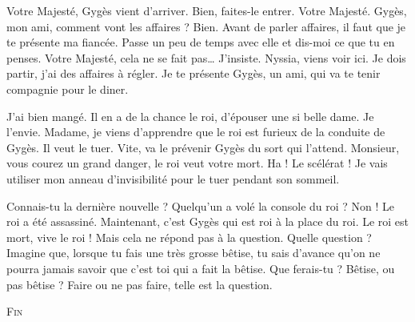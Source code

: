 \documentclass[12pt, a5paper, french]{memoir}
\begin{document}
\begin{linenumbers}
\begin{drama}
\scene[La fiancée]
\StageDir{\Gyges, \Candaule, \Nyssia, \Laurel}
\Laurelspeaks Votre Majesté, Gygès vient d’arriver.
\Candaulespeaks Bien, faites-le entrer.
\Gygesspeaks Votre Majesté.
\Candaulespeaks Gygès, mon ami, comment vont les affaires ?
\Gygesspeaks Bien.
\Candaulespeaks Avant de parler affaires, il faut que je te présente ma fiancée. Passe un peu de temps avec elle et dis-moi ce que tu en penses.
\Gygesspeaks Votre Majesté, cela ne se fait pas\dots
\Candaulespeaks J’insiste.  Nyssia, viens voir ici. Je dois partir, j’ai des affaires à régler. Je te présente Gygès, un ami, qui va te tenir compagnie pour le diner.
\newpage

\scene[L’assassinat]
\StageDir{\Gyges, \Nyssia, \Hardy}
\Gygesspeaks {} J’ai bien mangé. Il en a de la chance le roi, d’épouser une si belle dame. Je l’envie.
\Hardyspeaks Madame, je viens d’apprendre que le roi est furieux de la conduite de Gygès. Il veut le tuer.
\Nyssiaspeaks Vite, va le prévenir Gygès du sort qui l’attend.
\Hardyspeaks Monsieur, vous courez un grand danger, le roi veut votre mort.
\Gygesspeaks Ha ! Le scélérat ! Je vais utiliser mon anneau d’invisibilité pour le tuer pendant son sommeil.
\newpage

\scene[La question]
\StageDir{\Bonnie, \Clyde}
\Bonniespeaks Connais-tu la dernière nouvelle ?
\Clydespeaks Quelqu’un a volé la console du roi ?
\Bonniespeaks Non ! Le roi a été assassiné. Maintenant, c’est Gygès qui est roi à la place du roi.
\Clydespeaks Le roi est mort, vive le roi !
\Bonniespeaks Mais cela ne répond pas à la question.
\Clydespeaks Quelle question ?
\Bonniespeaks Imagine que, lorsque tu fais une très grosse bêtise, tu sais d’avance qu’on ne pourra jamais savoir que c’est toi qui a fait la bêtise. Que ferais-tu ? Bêtise, ou pas bêtise ? Faire ou ne pas faire, telle est la question.

\end{drama}
\end{linenumbers}

\centering
\vfill
\textsc{Fin}
\vfill
\thispagestyle{empty}
\end{document}
